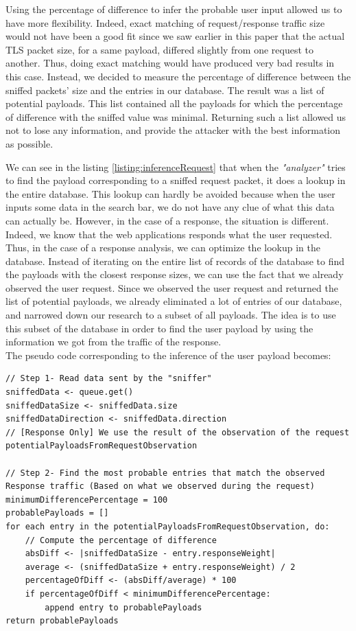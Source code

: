 \documentclass[journal]{IEEEtran}
\begin{document}
Using the percentage of difference to infer the probable user input allowed us to have more flexibility. Indeed, exact matching of request/response traffic size would not have been a good fit since we saw earlier in this paper that the actual TLS packet size, for a same payload, differed slightly from one request to another. Thus, doing exact matching would have produced very bad results in this case. Instead, we decided to measure the percentage of difference between the sniffed packets' size and the entries in our database. The result was a list of potential payloads. This list contained all the payloads for which the percentage of difference with the sniffed value was minimal. Returning such a list allowed us not to lose any information, and provide the attacker with the best information as possible.

We can see in the listing \ref{listing:inferenceRequest} that when the \emph{"analyzer"} tries to find the payload corresponding to a sniffed request packet, it does a lookup in the entire database. This lookup can hardly be avoided because when the user inputs some data in the search bar, we do not have any clue of what this data can actually be. However, in the case of a response, the situation is different. Indeed, we know that the web applications responds what the user requested. Thus, in the case of a response analysis, we can optimize the lookup in the database. Instead of iterating on the entire list of records of the database to find the payloads with the closest response sizes, we can use the fact that we already observed the user request. Since we observed the user request and returned the list of potential payloads, we already eliminated a lot of entries of our database, and narrowed down our research to a subset of all payloads. The idea is to use this subset of the database in order to find the user payload by using the information we got from the traffic of the response. \\

The pseudo code corresponding to the inference of the user payload becomes:

\begin{lstlisting}[caption=Pseudo algorithm to infer user input during a Response (using the result of the inference on the request), label={listing:inferenceResponse}]
// Step 1- Read data sent by the "sniffer"
sniffedData <- queue.get()
sniffedDataSize <- sniffedData.size
sniffedDataDirection <- sniffedData.direction
// [Response Only] We use the result of the observation of the request
potentialPayloadsFromRequestObservation

// Step 2- Find the most probable entries that match the observed Response traffic (Based on what we observed during the request)
minimumDifferencePercentage = 100
probablePayloads = []
for each entry in the potentialPayloadsFromRequestObservation, do:
	// Compute the percentage of difference
    absDiff <- |sniffedDataSize - entry.responseWeight|
    average <- (sniffedDataSize + entry.responseWeight) / 2
    percentageOfDiff <- (absDiff/average) * 100
    if percentageOfDiff < minimumDifferencePercentage:
    	append entry to probablePayloads
return probablePayloads
\end{lstlisting}
\end{document}
